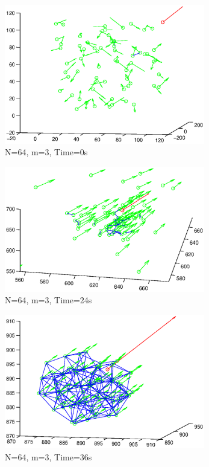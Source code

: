 \documentclass[10pt, conference]{IEEEtran}
\begin{document}
\begin{figure}[!p]
  \begin{center}
    \includegraphics[width=3.45in]{simThreeDt00}
  \end{center}

  \caption{\small N=64, m=3, Time=0s}
  \label{fig:simThreeDt00}
\end{figure}

\begin{figure}[!p]
  \begin{center}
    \includegraphics[width=3.45in]{simThreeDt24}
  \end{center}

  \caption{\small N=64, m=3, Time=24s}
  \label{fig:simThreeDt24}
\end{figure}

\begin{figure}[!p]
  \begin{center}
    \includegraphics[width=3.45in]{simThreeDt36}
  \end{center}

  \caption{\small N=64, m=3, Time=36s}
  \label{fig:simThreeDt36}
\end{figure}
\end{document}
